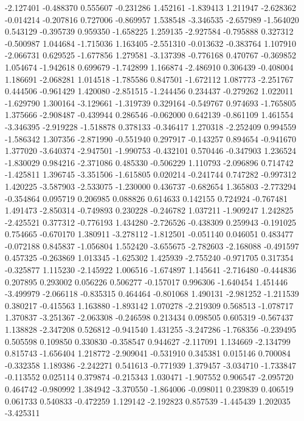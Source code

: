 -2.127401
-0.488370
0.555607
-0.231286
1.452161
-1.839413
1.211947
-2.628362
-0.014214
-0.207816
0.727006
-0.869957
1.538548
-3.346535
-2.657989
-1.564020
0.543129
-0.395739
0.959350
-1.658225
1.259135
-2.927584
-0.795888
0.327312
-0.500987
1.044684
-1.715036
1.163405
-2.551310
-0.013632
-0.383764
1.107910
-2.066731
0.629525
-1.677856
1.279581
-3.137398
-0.776168
0.470767
-0.369852
1.054674
-1.942618
0.699679
-1.742899
1.166874
-2.486910
0.306439
-0.408004
1.186691
-2.068281
1.014518
-1.785586
0.847501
-1.672112
1.087773
-2.251767
0.444506
-0.961429
1.420080
-2.851515
-1.244456
0.234437
-0.279262
1.022011
-1.629790
1.300164
-3.129661
-1.319739
0.329164
-0.549767
0.974693
-1.765805
1.375666
-2.908487
-0.439944
0.286546
-0.062000
0.642139
-0.861109
1.461554
-3.346395
-2.919228
-1.518878
0.378133
-0.346417
1.270318
-2.252409
0.994559
-1.586342
1.307356
-2.871990
-0.551940
0.297917
-0.143257
0.894654
-0.941670
1.377020
-3.640374
-2.947501
-1.990753
-0.432101
0.570446
-0.347903
1.236524
-1.830029
0.984216
-2.371086
0.485330
-0.506229
1.110793
-2.096896
0.714742
-1.425811
1.396745
-3.351506
-1.615805
0.020214
-0.241744
0.747282
-0.997312
1.420225
-3.587903
-2.533075
-1.230000
0.436737
-0.682654
1.365803
-2.773294
-0.354864
0.095719
0.206985
0.088826
0.614633
0.142155
0.724924
-0.767481
1.491473
-2.850314
-0.749893
0.230228
-0.246782
1.037211
-1.909247
1.242825
-2.425521
0.377312
-0.776193
1.434280
-2.726526
-0.438309
0.259943
-0.191025
0.754665
-0.670170
1.380911
-3.278112
-1.812501
-0.051140
0.046051
0.483477
-0.072188
0.845837
-1.056804
1.552420
-3.655675
-2.782603
-2.168088
-0.491597
0.457325
-0.263869
1.013345
-1.625302
1.425939
-2.755240
-0.971705
0.317354
-0.325877
1.115230
-2.145922
1.006516
-1.674897
1.145641
-2.716480
-0.444836
0.207895
0.293002
0.056226
0.506277
-0.157017
0.996306
-1.640454
1.451446
-3.499979
-2.066118
-0.835315
0.464464
-0.801068
1.490131
-2.981252
-1.211539
0.380217
-0.415563
1.163880
-1.893142
1.070278
-2.219309
0.568513
-1.078717
1.370837
-3.251367
-2.063308
-0.246598
0.213434
0.098505
0.605319
-0.567437
1.138828
-2.347208
0.526812
-0.941540
1.431255
-3.247286
-1.768356
-0.239495
0.505598
0.109850
0.330830
-0.358547
0.944627
-2.117091
1.134669
-2.134799
0.815743
-1.656404
1.218772
-2.909041
-0.531910
0.345381
0.015146
0.700084
-0.332358
1.189386
-2.242271
0.541613
-0.771939
1.379457
-3.034710
-1.733847
-0.113552
0.025114
0.379874
-0.215343
1.030471
-1.907552
0.906547
-2.095720
0.464742
-0.980992
1.384942
-3.370550
-1.864006
-0.098011
0.239839
0.406519
0.061733
0.540833
-0.472259
1.129142
-2.192823
0.857539
-1.445439
1.202035
-3.425311
